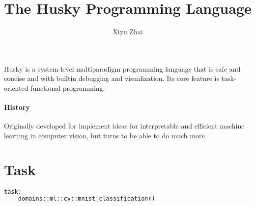\documentclass[11pt, oneside]{article}   	%
\title{The Husky Programming Language}
\author{Xiyu Zhai}
\date{}							%
\theoremstyle{definition}
\begin{document}
\maketitle
\tableofcontents

Husky is a system-level multiparadigm programming language that is safe and concise and with builtin debugging and visualization. Its core feature is task-oriented functional programming.

\paragraph{History} 
Originally developed for implement ideas for interpretable and efficient machine learning in computer vision, but turns to be able to do much more.

\section{Task}
\begin{lstlisting}[language=Python, columns=fullflexible]
task:
	domains::ml::cv::mnist_classification()
\end{lstlisting}
\end{document}
